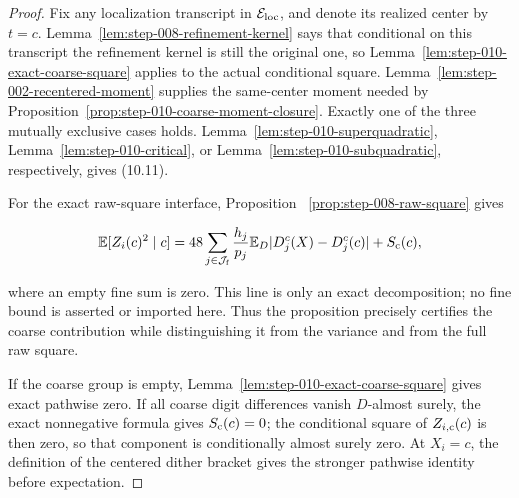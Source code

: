 \begin{proof}
Fix any localization transcript in
\(\mathcal E_{\rm loc}\), and denote its realized center by \(t=c\).
Lemma~\ref{lem:step-008-refinement-kernel} says that conditional on this
transcript the refinement kernel is still the original one, so
Lemma~\ref{lem:step-010-exact-coarse-square}
applies to the actual conditional square. Lemma~\ref{lem:step-002-recentered-moment} supplies the
same-center moment needed by
Proposition~\ref{prop:step-010-coarse-moment-closure}. Exactly one of the
three mutually exclusive cases holds. Lemma~\ref{lem:step-010-superquadratic},
Lemma~\ref{lem:step-010-critical}, or
Lemma~\ref{lem:step-010-subquadratic}, respectively, gives (10.11).

For the exact raw-square interface, Proposition~
\ref{prop:step-008-raw-square} gives

\[
\mathbb E[Z_i(c)^2\mid c]
=48\sum_{j\in\mathcal J_{\rm f}}\frac{h_j}{p_j}
  \mathbb E_D|D_j^c(X)-D_j^c(c)|
 +S_{\rm c}(c),
\]

where an empty fine sum is zero. This line is only an exact decomposition; no
fine bound is asserted or imported here. Thus the proposition precisely
certifies the coarse contribution while distinguishing it from the variance
and from the full raw square.

If the coarse group is empty, Lemma~\ref{lem:step-010-exact-coarse-square}
gives exact pathwise zero. If all coarse digit differences vanish
\(D\)-almost surely, the exact nonnegative formula gives
\(S_{\rm c}(c)=0\); the conditional square of \(Z_{i,{\rm c}}(c)\) is then
zero, so that component is conditionally almost surely zero. At \(X_i=c\),
the definition of the centered dither bracket gives the stronger pathwise
identity before expectation.
\end{proof}

